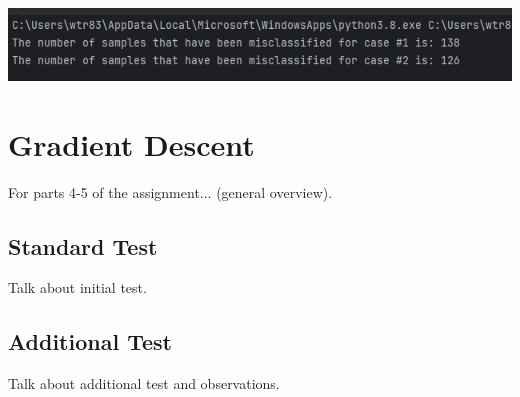 \documentclass{article}
\begin{document}
\begin{center}
\includegraphics[scale=0.75]{../figs/P2.4.png}\\
\end{center}

\section{Gradient Descent}

For parts 4-5 of the assignment... (general overview).

\subsection{Standard Test}

Talk about initial test.

\subsection{Additional Test}

Talk about additional test and observations.
\end{document}
